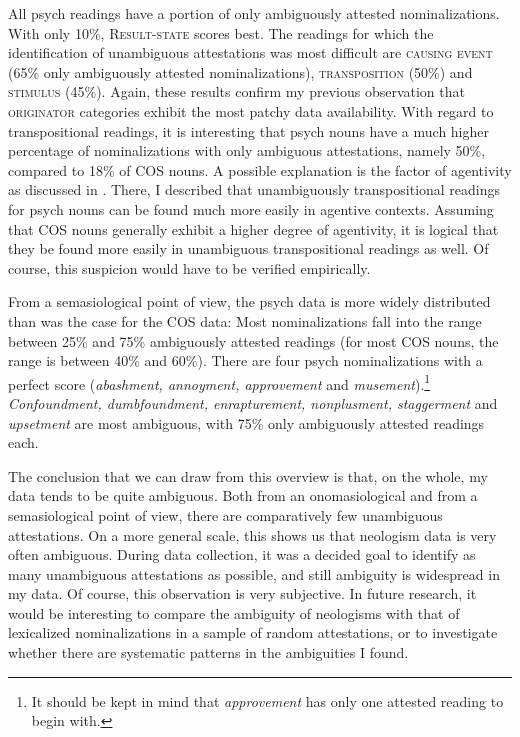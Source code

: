 All psych readings have a portion of only ambiguously attested nominalizations. With only 10\%, \textsc{Result-state} scores best.
The readings for which the identification of unambiguous attestations was most difficult are \textsc{causing event} (65\% only ambiguously attested nominalizations), \textsc{transposition} (50\%) and \textsc{stimulus} (45\%). Again, these results confirm my previous observation that \textsc{originator} categories exhibit the most patchy data availability. With regard to transpositional readings, it is interesting that psych nouns have a much higher percentage of nominalizations with only ambiguous attestations, namely 50\%, compared to 18\% of COS nouns. A possible explanation is the factor of agentivity as discussed in . There, I described that 
unambiguously transpositional readings for psych nouns can be found much more easily in agentive contexts. Assuming that COS nouns generally exhibit a higher degree of agentivity, it is logical that they be found more easily in unambiguous transpositional readings as well. Of course, this suspicion would have to be verified empirically.

From a semasiological point of view, the psych data is more widely distributed than was the case for the COS data: Most nominalizations fall into the range between 25\% and 75\% ambiguously attested readings (for most COS nouns, the range is between 40\% and 60\%). There are four psych nominalizations with a perfect score (\textit{abashment, annoyment, approvement} and \textit{musement}).\footnote{It should be kept in mind that \textit{approvement} has only one attested reading to begin with.} \textit{Confoundment, dumbfoundment, enrapturement, nonplusment, staggerment} and \textit{upsetment} are most ambiguous, with 75\% only ambiguously attested readings each.

The conclusion that we can draw from this overview is that, on the whole, my data tends to be quite ambiguous. Both from an onomasiological and from a semasiological point of view, there are comparatively few unambiguous attestations. 
On a more general scale, this shows us that neologism data is very often ambiguous. During data collection, it was a decided goal to identify as many unambiguous attestations as possible, and still ambiguity is widespread in my data.
Of course, this observation is very subjective. In future research, it would be interesting to compare the ambiguity of neologisms with that of lexicalized nominalizations in a sample of random attestations, or to investigate whether there are systematic patterns in the ambiguities I found. 


